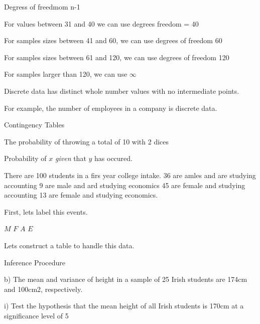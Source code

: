Degress of freedmom n-1

For values between 31 and 40 we can use degrees freedom = 40

For samples sizes between 41 and 60, we can use degrees of freedom 60

For samples sizes between 61 and 120, we can use degrees of freedom 120

For samples larger than 120, we can use $\infty$




%


Discrete data has distinct whole number values with no intermediate points.

For example, the number of employees in a company is discrete data.


Contingency Tables

The probability of throwing a total of 10 with 2 dices


Probability of $x$ \emph{given} that $y$ has occured.


There are 100 students in a firs year college intake. 36 are amles and are studying accounting
9 are male and ard studying economics
45 are female and studying accounting
13 are female and studying economics.

First, lets label this events.

$M$
$F$
$A$
$E$

Lets construct a table to handle this data.




Inference Procedure

b)	The mean and variance of height in a sample of 25 Irish students are 174cm and 100cm2, respectively.

i)	Test the hypothesis that the mean height of all Irish students is 170cm at a significance level of 5%

